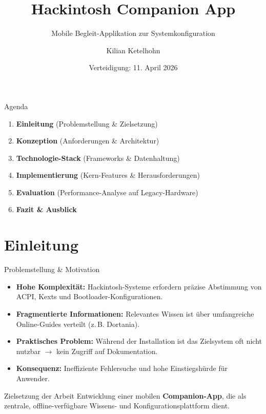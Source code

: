 \documentclass[10pt]{beamer}
\title{Hackintosh Companion App}
\subtitle{Mobile Begleit-Applikation zur Systemkonfiguration}
\author{Kilian Ketelhohn}
\institute{Hochschule Wismar \\ Fachbereich Informatik}
\date{Verteidigung: 11. April 2026}
\begin{document}
\begin{frame}
    \titlepage
\end{frame}


\begin{frame}{Agenda}
    \begin{enumerate}
        \item \textbf{Einleitung} (Problemstellung \& Zielsetzung)
        \item \textbf{Konzeption} (Anforderungen \& Architektur)
        \item \textbf{Technologie-Stack} (Frameworks \& Datenhaltung)
        \item \textbf{Implementierung} (Kern-Features \& Herausforderungen)
        \item \textbf{Evaluation} (Performance-Analyse auf Legacy-Hardware)
        \item \textbf{Fazit \& Ausblick}
    \end{enumerate}
\end{frame}

\section{Einleitung}

\begin{frame}{Problemstellung \& Motivation}
    \begin{itemize}
        \item \textbf{Hohe Komplexität:} Hackintosh-Systeme erfordern präzise Abstimmung von ACPI, Kexts und Bootloader-Konfigurationen.
        
        \item \textbf{Fragmentierte Informationen:} Relevantes Wissen ist über umfangreiche Online-Guides verteilt (z.\,B. Dortania).
        
        \item \textbf{Praktisches Problem:} Während der Installation ist das Zielsystem oft nicht nutzbar $\rightarrow$ kein Zugriff auf Dokumentation.
        
        \item \textbf{Konsequenz:} Ineffiziente Fehlersuche und hohe Einstiegshürde für Anwender.
    \end{itemize}

    \begin{block}{Zielsetzung der Arbeit}
        Entwicklung einer mobilen \textbf{Companion-App}, die als zentrale, offline-verfügbare Wissens- und Konfigurationsplattform dient.
    \end{block}
\end{frame}
\end{document}
